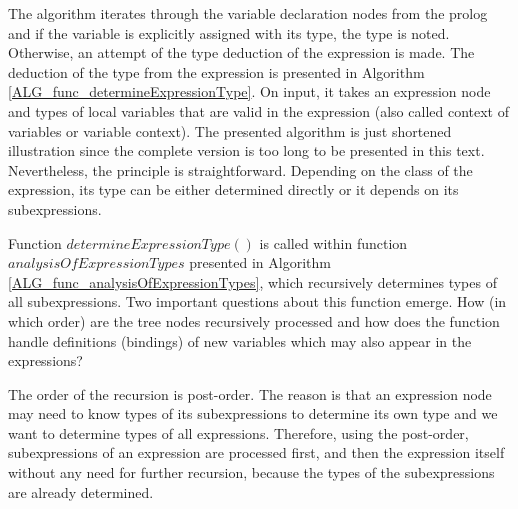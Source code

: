 
The algorithm iterates through the variable declaration nodes from the prolog and if the variable is explicitly assigned with its type, the type is noted. Otherwise, an attempt of the type deduction of the expression is made. The deduction of the type from the expression is presented in Algorithm \ref{ALG_func_determineExpressionType}. On input, it takes an expression node and types of local variables that are valid in the expression (also called context of variables or variable context). The presented algorithm is just shortened illustration since the complete version is too long to be presented in this text. Nevertheless, the principle is straightforward. Depending on the class of the expression, its type can be either determined directly or it depends on its subexpressions. 

Function $determineExpressionType()$ is called within function $analysisOfExpressionTypes$ presented in Algorithm \ref{ALG_func_analysisOfExpressionTypes}, which recursively determines types of all subexpressions. Two important questions about this function emerge. How (in which order) are the tree nodes recursively processed and how does the function handle definitions (bindings) of new variables which may also appear in the expressions?

The order of the recursion is post-order. The reason is that an expression node may need to know types of its subexpressions to determine its own type and we want to determine types of all expressions. Therefore, using the post-order, subexpressions of an expression are processed first, and then the expression itself without any need for further recursion, because the types of the subexpressions are already determined.

